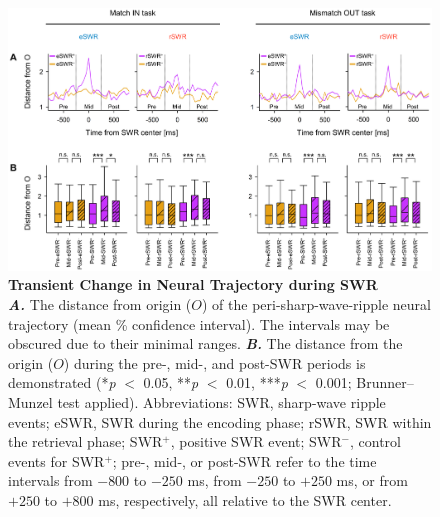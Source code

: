 \documentclass[preprint,review,12pt]{elsarticle}%
\begin{document}
        \clearpage
        \begin{figure}[ht]
        	\centering
            \includegraphics[width=1\textwidth]{./src/figures/.png/Figure_ID_05.png}
        	\caption{\textbf{Transient Change in Neural Trajectory during SWR}
\smallskip
\\
\textbf{\textit{A.}} The distance from origin ($O$) of the peri-sharp-wave-ripple neural trajectory (mean \% confidence interval). The intervals may be obscured due to their minimal ranges. \textbf{\textit{B.}} The distance from the origin ($O$) during the pre-, mid-, and post-SWR periods is demonstrated (*\textit{p} $<$ 0.05, **\textit{p} $<$ 0.01, ***\textit{p} $<$ 0.001; Brunner--Munzel test applied). Abbreviations: SWR, sharp-wave ripple events; eSWR, SWR during the encoding phase; rSWR, SWR within the retrieval phase; SWR$^+$, positive SWR event; SWR$^-$, control events for SWR$^+$; pre-, mid-, or post-SWR refer to the time intervals from $-800$ to $-250$ ms, from $-250$ to $+250$ ms, or from $+250$ to $+800$ ms, respectively, all relative to the SWR center.}
        	\label{fig:05}
        \end{figure}
        \clearpage
\end{document}
